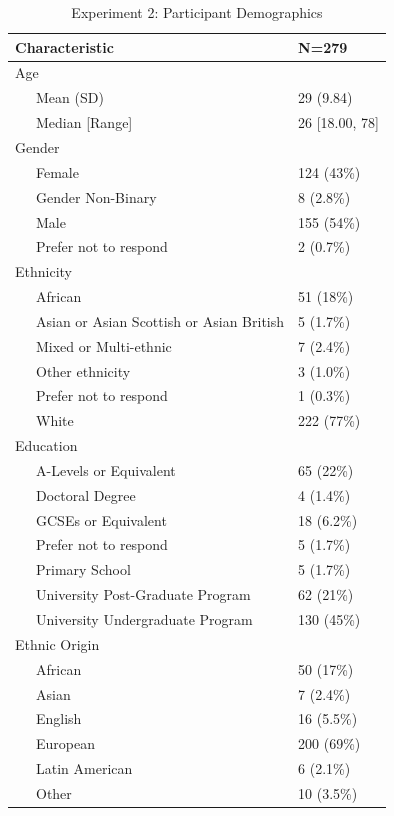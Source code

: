 \documentclass[
  donotrepeattitle,doc, 12pt, a4paper,floatsintext]{apa7}
\begin{document}
\begin{table}[tbp]

\begin{center}
\begin{threeparttable}

\caption{\label{tab:demographicTableExperiment2}Experiment 2: Participant Demographics}

\begin{tabular}{ll}
\toprule
Characteristic & N=279\\
\midrule
Age & \\
\ \ \ Mean (SD) & 29 (9.84)\\
\ \ \ Median [Range] & 26 [18.00, 78]\\
Gender & \\
\ \ \ Female & 124 (43\%)\\
\ \ \ Gender Non-Binary & 8 (2.8\%)\\
\ \ \ Male & 155 (54\%)\\
\ \ \ Prefer not to respond & 2 (0.7\%)\\
Ethnicity & \\
\ \ \ African & 51 (18\%)\\
\ \ \ Asian  or  Asian Scottish  or  Asian British & 5 (1.7\%)\\
\ \ \ Mixed  or  Multi-ethnic & 7 (2.4\%)\\
\ \ \ Other ethnicity & 3 (1.0\%)\\
\ \ \ Prefer not  to respond & 1 (0.3\%)\\
\ \ \ White & 222 (77\%)\\
Education & \\
\ \ \ A-Levels  or  Equivalent & 65 (22\%)\\
\ \ \ Doctoral  Degree & 4 (1.4\%)\\
\ \ \ GCSEs  or  Equivalent & 18 (6.2\%)\\
\ \ \ Prefer not  to respond & 5 (1.7\%)\\
\ \ \ Primary School & 5 (1.7\%)\\
\ \ \ University  Post-Graduate  Program & 62 (21\%)\\
\ \ \ University  Undergraduate  Program & 130 (45\%)\\
Ethnic Origin & \\
\ \ \ African & 50 (17\%)\\
\ \ \ Asian & 7 (2.4\%)\\
\ \ \ English & 16 (5.5\%)\\
\ \ \ European & 200 (69\%)\\
\ \ \ Latin American & 6 (2.1\%)\\
\ \ \ Other & 10 (3.5\%)\\
\bottomrule
\end{tabular}

\end{threeparttable}
\end{center}

\end{table}
\end{document}
